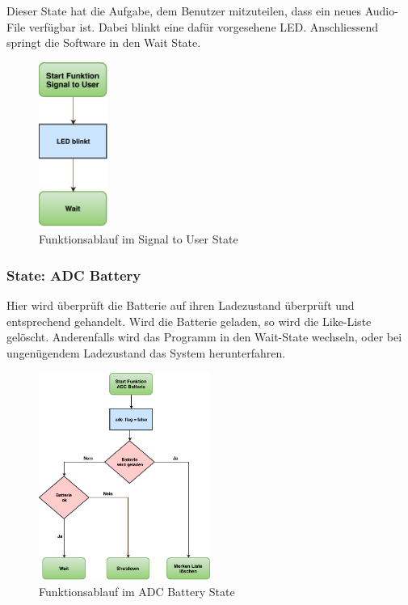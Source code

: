 Dieser State hat die Aufgabe, dem Benutzer mitzuteilen, dass ein neues Audio-File verfügbar ist. Dabei blinkt eine dafür vorgesehene LED. Anschliessend springt die Software in den Wait State.

\begin{figure}[htbp!!!!]
	\centering
	\includegraphics[width=0.2\textwidth]{Data/SignalToUser_picture.pdf}
	\caption[Statemachine: Signal to User]{Funktionsablauf im Signal to User State}
	\label{fig:signalToUserState}
\end{figure} 

\subsubsection*{State: ADC Battery}

Hier wird überprüft die Batterie auf ihren Ladezustand überprüft und entsprechend gehandelt. Wird die Batterie geladen, so wird die Like-Liste gelöscht. Anderenfalls wird das Programm in den Wait-State wechseln, oder bei ungenügendem Ladezustand das System herunterfahren.

\begin{figure}[htbp!!!!]
	\centering
	\includegraphics[width=0.5\textwidth]{Data/ADC_Battery_picture.pdf}
	\caption[Statemachine: ADC Battery]{Funktionsablauf im ADC Battery State}
	\label{fig:adcBatteryState}
\end{figure} 


